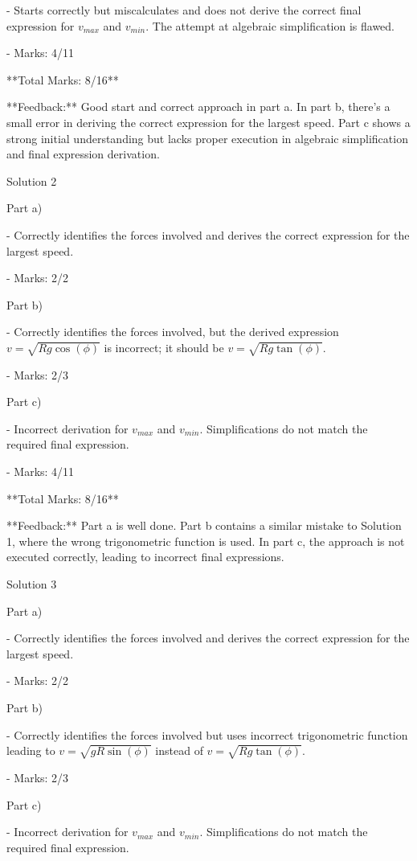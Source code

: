 \documentclass[a4paper,11pt]{article}
\begin{document}
- Starts correctly but miscalculates and does not derive the correct final expression for \( v_{max} \) and \( v_{min} \). The attempt at algebraic simplification is flawed.

- Marks: 4/11

**Total Marks: 8/16**

**Feedback:** Good start and correct approach in part a. In part b, there's a small error in deriving the correct expression for the largest speed. Part c shows a strong initial understanding but lacks proper execution in algebraic simplification and final expression derivation.

Solution 2

Part a)

- Correctly identifies the forces involved and derives the correct expression for the largest speed.

- Marks: 2/2

Part b)

- Correctly identifies the forces involved, but the derived expression \( v = \sqrt{Rg\cos(\phi)} \) is incorrect; it should be \( v = \sqrt{Rg\tan(\phi)} \).

- Marks: 2/3

Part c)

- Incorrect derivation for \( v_{max} \) and \( v_{min} \). Simplifications do not match the required final expression.

- Marks: 4/11

**Total Marks: 8/16**

**Feedback:** Part a is well done. Part b contains a similar mistake to Solution 1, where the wrong trigonometric function is used. In part c, the approach is not executed correctly, leading to incorrect final expressions.

Solution 3

Part a)

- Correctly identifies the forces involved and derives the correct expression for the largest speed.

- Marks: 2/2

Part b)

- Correctly identifies the forces involved but uses incorrect trigonometric function leading to \( v = \sqrt{g R \sin(\phi)} \) instead of \( v = \sqrt{Rg\tan(\phi)} \).

- Marks: 2/3

Part c)

- Incorrect derivation for \( v_{max} \) and \( v_{min} \). Simplifications do not match the required final expression.
\end{document}
